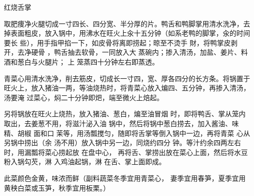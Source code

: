 \begin{recipe}{红烧舌掌}

\ingredients


\preparation

\step 取肥痩净火腿切成一寸四长、四分宽、半分厚的片。鸭舌和鸭脚掌用清水洗净，去
掉表面粗皮，放入锅中，用沸水在旺火上汆十五分钟（如系老鸭的脚掌，汆的时间要长
些），用手指甲掐一下，如皮骨将离即捞起；晾至不烫手 財，将鸭掌皮剥开，去净硬骨
，鸭舌抽去软骨，一同放入大 蒸碗内；掺入清汤，加盐、姜片、料酒和葱白与火腿片；
上 笼蒸四十分钟左右即蒸透。

\step 青菜心用清水洗净，削去筋皮，切成长一寸四，宽、厚各四分的长方条。将锅置于
旺火上，放入猪油一两，等油烧热时，将青菜心放入煸四、五分钟，再掺入清汤，汤要淹
过菜心，焖二十分钟即𤆵，端至微火上焙起。

\step 另将锅放在旺火上烧热，放入猪油、葱白，煸至油冒烟 时，即将鸭舌、掌从笼内
取出，去姜葱不用，将滋汁泌入油 锅中，然后将锅中葱白捞去，加入酱油、味精、胡椒
面和口 茉等，用汤瓢搅匀，随即将舌掌等倒入锅中一边，再将青菜 心从另锅中捞出（余
汤不用）放入锅中另一边，同烧约四分 钟。等汁约余四两左右时，用漏瓢将菜心捞起放
在盘中心， 再将舌、掌捞出放在菜心上面，然后将水豆粉入锅勾芡，淋 入鸡油起锅，淋
在舌、掌上面即成。

\features

此菜颜色金黄，味浓而鲜（副料蔬菜冬季宜用青菜心， 妻季宜用春笋，夏季宜用黄秧白菜或玉笋，秋季宜用板栗。）

\end{recipe}

